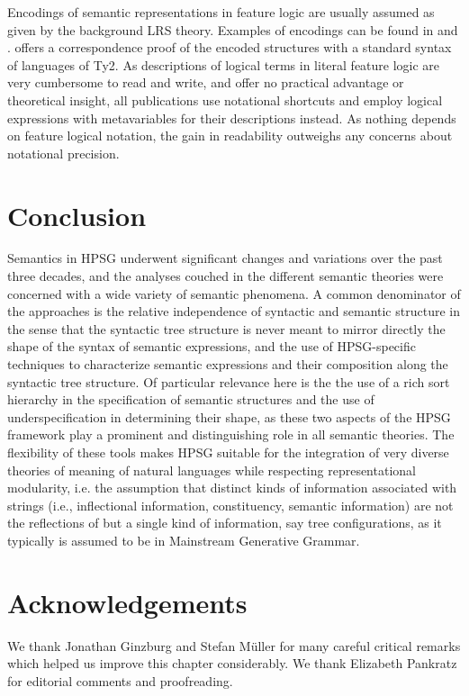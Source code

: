 \documentclass[output=paper]{langsci/langscibook}
\begin{document}
Encodings of semantic representations in feature logic are usually assumed as given by the background LRS theory. Examples of encodings can be found in \citet{Sailer2000a} and \citet{Richter2004a-u}. \citet{Sailer2000a} offers a correspondence proof of the encoded structures with a standard syntax of languages of Ty2. As descriptions of logical terms in literal feature logic are very cumbersome to read and write, and offer no practical advantage or theoretical insight, all publications use notational shortcuts and employ logical expressions with metavariables for their descriptions instead. As nothing depends on feature logical notation, the gain in readability outweighs any concerns about notational precision.

\section{Conclusion}

Semantics in HPSG underwent significant changes and variations over the past three decades, and the analyses couched in the different semantic theories were concerned with a wide variety of semantic phenomena. A common denominator of the approaches is the relative independence of syntactic and semantic structure in the sense that the syntactic tree structure is never meant to mirror directly the shape of the syntax of semantic expressions, and the use of HPSG-specific techniques to characterize semantic expressions and their composition along the syntactic tree structure. Of particular relevance here is the the use of a rich sort hierarchy in the specification of semantic structures and the use of underspecification in determining their shape, as these two aspects of the HPSG framework play a prominent and distinguishing role in all semantic theories. The flexibility of these tools makes HPSG suitable for the integration of very diverse theories of meaning of natural languages while respecting representational modularity, i.e. the assumption that distinct kinds of information associated with strings (i.e., inflectional information, constituency, semantic information) are not the reflections of but a single kind of information, say tree configurations, as it typically is assumed to be in Mainstream Generative Grammar.




\section*{Acknowledgements}

We thank Jonathan Ginzburg and Stefan M\"uller for many careful critical remarks which helped
us improve this chapter considerably. We thank
Elizabeth Pankratz for editorial comments and proofreading.


{\sloppy
\printbibliography[heading=subbibliography,notkeyword=this] 
}
\end{document}
